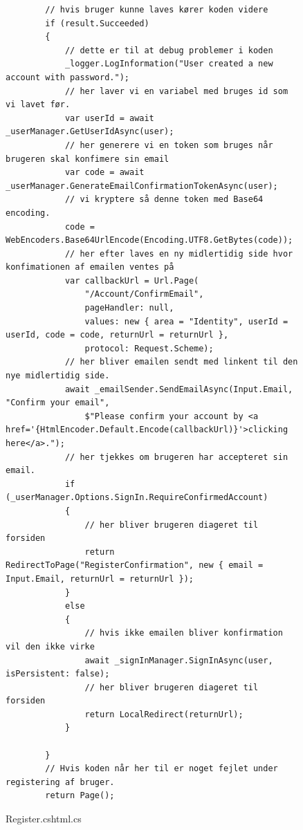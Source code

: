 \begin{figure}[!h]
    \begin{verbatim}
        // hvis bruger kunne laves kører koden videre 
        if (result.Succeeded)
        {
            // dette er til at debug problemer i koden
            _logger.LogInformation("User created a new account with password.");
            // her laver vi en variabel med bruges id som vi lavet før.
            var userId = await _userManager.GetUserIdAsync(user);
            // her generere vi en token som bruges når brugeren skal konfimere sin email
            var code = await _userManager.GenerateEmailConfirmationTokenAsync(user);
            // vi kryptere så denne token med Base64 encoding.
            code = WebEncoders.Base64UrlEncode(Encoding.UTF8.GetBytes(code));
            // her efter laves en ny midlertidig side hvor konfimationen af emailen ventes på
            var callbackUrl = Url.Page(
                "/Account/ConfirmEmail",
                pageHandler: null,
                values: new { area = "Identity", userId = userId, code = code, returnUrl = returnUrl },
                protocol: Request.Scheme);
            // her bliver emailen sendt med linkent til den nye midlertidig side.
            await _emailSender.SendEmailAsync(Input.Email, "Confirm your email",
                $"Please confirm your account by <a href='{HtmlEncoder.Default.Encode(callbackUrl)}'>clicking here</a>.");
            // her tjekkes om brugeren har accepteret sin email.
            if (_userManager.Options.SignIn.RequireConfirmedAccount)
            {
                // her bliver brugeren diageret til forsiden
                return RedirectToPage("RegisterConfirmation", new { email = Input.Email, returnUrl = returnUrl });
            }
            else
            {
                // hvis ikke emailen bliver konfirmation vil den ikke virke
                await _signInManager.SignInAsync(user, isPersistent: false);
                // her bliver brugeren diageret til forsiden
                return LocalRedirect(returnUrl);
            }

        }
        // Hvis koden når her til er noget fejlet under registering af bruger.
        return Page();
\end{verbatim}
\caption{Register.cshtml.cs}\label{code:Register.cshtml.cs}
\end{figure}


